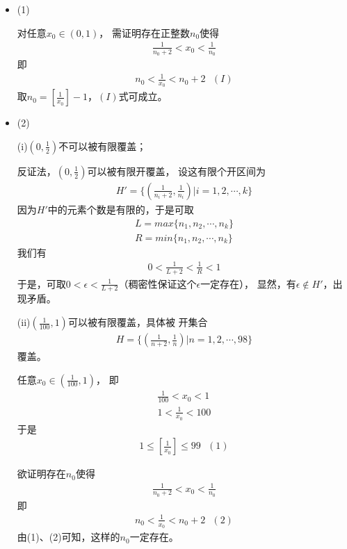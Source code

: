 \documentclass{article}
\begin{document}
\begin{itemize}
  \item (1)

        对任意$x_0 \in (0, 1)$，
        需证明存在正整数$n_0$使得
        \begin{align*}
          \frac{1}{n_0 + 2} < x_0 < \frac{1}{n_0}
        \end{align*}
        即
        \begin{align*}
          n_0 < \frac{1}{x_0} < n_0 + 2 \ \ \ (I)
        \end{align*}
        取$n_0 = \left[\frac{1}{x_0}\right] - 1$，$(I)$式可成立。

  \item (2)

        (i)$\left(0, \frac{1}{2}\right)$不可以被有限覆盖；

        反证法，$\left(0, \frac{1}{2}\right)$可以被有限开覆盖，
        设这有限个开区间为
        \begin{align*}
          H' = \{\left(\frac{1}{n_i + 2}, \frac{1}{n_i}\right)| i = 1, 2, \cdots, k\}
        \end{align*}
        因为$H'$中的元素个数是有限的，于是可取
        \begin{align*}
          L = max\{n_1, n_2, \cdots, n_k\} \\
          R = min\{n_1, n_2, \cdots, n_k\}
        \end{align*}
        我们有
        \begin{align*}
          0 < \frac{1}{L + 2} < \frac{1}{R} < 1
        \end{align*}
        于是，可取$0 < \epsilon < \frac{1}{L + 2}$（稠密性保证这个$\epsilon$一定存在），
        显然，有$\epsilon \notin H'$，出现矛盾。

        (ii)$\left(\frac{1}{100}, 1\right)$可以被有限覆盖，具体被
        开集合
        \begin{align*}
          H = \{\left(\frac{1}{n + 2}, \frac{1}{n}\right)| n = 1, 2, \cdots, 98\}
        \end{align*}
        覆盖。

        任意$x_0 \in \left(\frac{1}{100}, 1\right)$， 即
        \begin{align*}
          \frac{1}{100} < x_0 < 1 \\
          1 < \frac{1}{x_0} < 100
        \end{align*}
        于是
        \begin{align*}
          1 \leq [\frac{1}{x_0}] \leq 99 \ \ \ (1)
        \end{align*}

        欲证明存在$n_0$使得
        \begin{align*}
          \frac{1}{n_0 + 2} < x_0 < \frac{1}{n_0}
        \end{align*}
        即
        \begin{align*}
          n_0 < \frac{1}{x_0} < n_0 + 2 \ \ \ (2)
        \end{align*}
        由(1)、(2)可知，这样的$n_0$一定存在。

\end{itemize}
\end{document}
